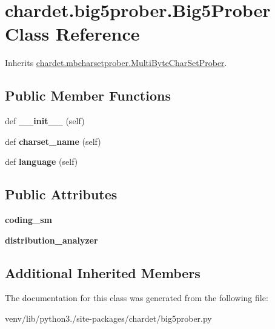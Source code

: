 \hypertarget{classchardet_1_1big5prober_1_1_big5_prober}{}\section{chardet.\+big5prober.\+Big5\+Prober Class Reference}
\label{classchardet_1_1big5prober_1_1_big5_prober}


Inherits \hyperlink{classchardet_1_1mbcharsetprober_1_1_multi_byte_char_set_prober}{chardet.\+mbcharsetprober.\+Multi\+Byte\+Char\+Set\+Prober}.

\subsection*{Public Member Functions}
\begin{DoxyCompactItemize}
\item 
\mbox{\label{classchardet_1_1big5prober_1_1_big5_prober_a9f918277b54c14cae7785176bc20a1d9}} 
def {\bfseries \+\_\+\+\_\+init\+\_\+\+\_\+} (self)
\item 
\mbox{\label{classchardet_1_1big5prober_1_1_big5_prober_a28287b0a156eefeeb14631cb60e6512e}} 
def {\bfseries charset\+\_\+name} (self)
\item 
\mbox{\label{classchardet_1_1big5prober_1_1_big5_prober_a018ebace035d282dc4b76739df14e7e5}} 
def {\bfseries language} (self)
\end{DoxyCompactItemize}
\subsection*{Public Attributes}
\begin{DoxyCompactItemize}
\item 
\mbox{\label{classchardet_1_1big5prober_1_1_big5_prober_a6303cfc6dc3c25a0523ce498311d8d67}} 
{\bfseries coding\+\_\+sm}
\item 
\mbox{\label{classchardet_1_1big5prober_1_1_big5_prober_ab11efc3176280add3608b85f5a4a8200}} 
{\bfseries distribution\+\_\+analyzer}
\end{DoxyCompactItemize}
\subsection*{Additional Inherited Members}


The documentation for this class was generated from the following file\+:\begin{DoxyCompactItemize}
\item 
venv/lib/python3./site-\/packages/chardet/big5prober.\+py\end{DoxyCompactItemize}
